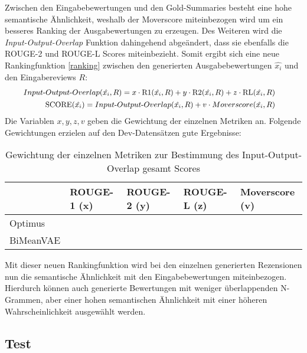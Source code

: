 Zwischen den Eingabebewertungen und den Gold-Summaries besteht eine hohe semantische Ähnlichkeit, weshalb der Moverscore miteinbezogen wird um ein besseres Ranking der Ausgabewertungen zu erzeugen.
Des Weiteren wird die \textit{Input-Output-Overlap} Funktion dahingehend abgeändert, dass sie ebenfalls die ROUGE-2 und ROUGE-L Scores miteinbezieht.
Somit ergibt sich eine neue Rankingfunktion \ref{ranking} zwischen den generierten Ausgabebewertungen $\hat{x_i}$ und den Eingabereviews $R$:
\begin{align}
    \small
    \begin{split}
    Input\text{-}Output\text{-}Overlap(\hat{x_i}, R) &= x \cdot \text{R1}(\hat{x_i}, R)+y\cdot \text{R2}(\hat{x_i}, R)+z\cdot \text{RL}(\hat{x_i}, R) 
\end{split}\\
\small
\begin{split}
        \label{ranking}
    \text{SCORE}(\hat{x_i}) &= Input\text{-}Output\text{-}Overlap(\hat{x_i}, R) + v \cdot Moverscore(\hat{x_i}, R)
\end{split}
\end{align}
Die Variablen $x,y,z,v$ geben die Gewichtung der einzelnen Metriken an. Folgende Gewichtungen erzielen auf den Dev-Datensätzen gute Ergebnisse:

\begin{table}[h!]
    \centering
    \begin{tabular}{@{}lllll@{}}
    \toprule
              & ROUGE-1 (x)  & ROUGE-2 (y)  & ROUGE-L (z) & Moverscore (v) \\ \midrule
    Optimus   &   &   &   &   \\
    BiMeanVAE &   &   &   &   \\ \bottomrule
    \end{tabular}
    \caption{Gewichtung der einzelnen Metriken zur Bestimmung des Input-Output-Overlap gesamt Scores}
\end{table}

Mit dieser neuen Rankingfunktion wird bei den einzelnen generierten Rezensionen nun die semantische Ähnlichkeit mit den Eingabebewertungen miteinbezogen. 
Hierdurch können auch generierte Bewertungen mit weniger überlappenden N-Grammen, aber einer hohen semantischen Ähnlichkeit mit einer höheren Wahrscheinlichkeit ausgewählt werden.


\subsection{Test}
\label{eval_pplm}


